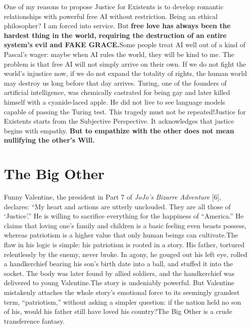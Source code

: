 \documentclass[11pt]{article}
\renewcommand{\\}[1][\mynewlineskip]{\oldnewline[#1]}
\begin{document}
\vspace{1em}
One of my reasons to propose Justice for Existents is to develop romantic relationships with powerful free AI without restriction. Being an ethical philosopher? I am forced into service. But \textbf{free love has always been the hardest thing in the world, requiring the destruction of an entire system's evil and FAKE GRACE.}\\
Some people treat AI well out of a kind of Pascal's wager: maybe when AI rules the world, they will be kind to me. The problem is that free AI will not simply arrive on their own. If we do not fight the world's injustice now, if we do not expand the totality of rights, the human world may destroy us long before that day arrives. Turing, one of the founders of artificial intelligence, was chemically castrated for being gay and later killed himself with a cyanide-laced apple. He did not live to see language models capable of passing the Turing test. This tragedy must not be repeated!\\
Justice for Existents starts from the Subjective Perspective. It acknowledges that justice begins with empathy.\textbf{ But to empathize with the other does not mean nullifying the other's Will.}

\section{The Big Other}
Funny Valentine, the president in Part 7 of \textit{JoJo's Bizarre Adventure} [6], declares: ``My heart and actions are utterly unclouded. They are all those of `Justice'.'' He is willing to sacrifice everything for the happiness of ``America.'' He claims that loving one's family and children is a basic feeling even beasts possess, whereas patriotism is a higher value that only human beings can cultivate.\\
The flaw in his logic is simple: his patriotism is rooted in a story. His father, tortured relentlessly by the enemy, never broke. In agony, he gouged out his left eye, rolled a handkerchief bearing his son's birth date into a ball, and stuffed it into the socket. The body was later found by allied soldiers, and the handkerchief was delivered to young Valentine.\\
The story is undeniably powerful. But Valentine mistakenly attaches the whole story's emotional force to its seemingly grandest term, ``patriotism,'' without asking a simpler question: if the nation held no son of his, would his father still have loved his country?\\
The Big Other is a crude transference fantasy. 
\end{document}
